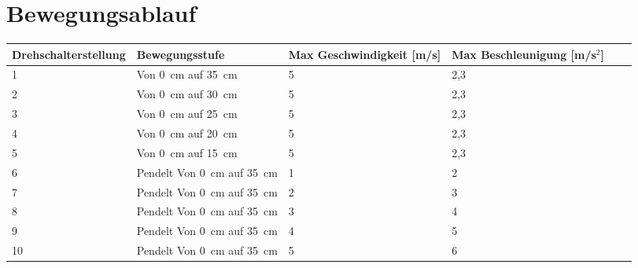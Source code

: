 \documentclass[12pt,a4paper]{scrbook}
\begin{document}
		\section{Bewegungsablauf}
	
\fontsize{8}{10}\selectfont
\begin{tabularx}{\textwidth}{|p{3cm}|X|X|X|p{1cm}|X|}
	\hline 
	\textbf{Drehschalterstellung}  & \textbf{Bewegungsstufe} & \textbf{Max Geschwindigkeit [m/s]} &  \textbf{Max Beschleunigung [m/s$^{2}$]} \\ \hline
	1 & Von 0\ cm auf 35\ cm & 5 & 2,3   \\
	\hline
	2 & Von 0\ cm auf 30\ cm & 5 & 2,3 \\
	\hline
	3 & Von 0\ cm auf 25\ cm & 5 & 2,3 \\
	\hline
	4 & Von 0\ cm auf 20\ cm & 5 & 2,3 \\
	\hline
	5 & Von 0\ cm auf 15\ cm & 5 & 2,3 \\
	\hline
	6 & Pendelt Von 0\ cm auf 35\ cm & 1 & 2 \\
	\hline
	7 &Pendelt Von 0\ cm auf 35\ cm & 2 & 3 \\
	\hline
	8 & Pendelt Von 0\ cm auf 35\ cm & 3 & 4 \\
	\hline
	9 & Pendelt Von 0\ cm auf 35\ cm & 4 & 5 \\
	\hline
	10 & Pendelt Von 0\ cm auf 35\ cm & 5 & 6 \\
	\hline
	
	
\end{tabularx}
	
	


	



	

	


	
\end{document}
